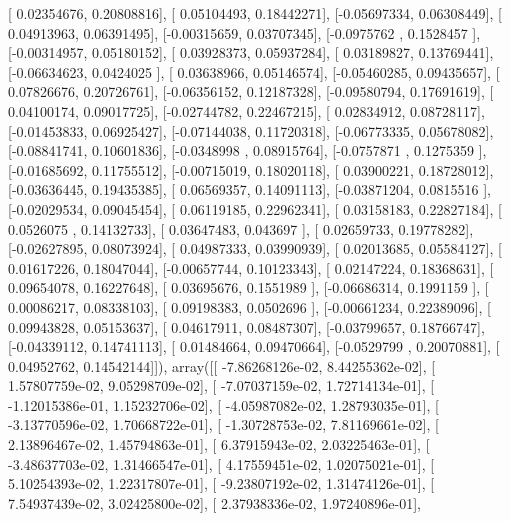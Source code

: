 \documentclass{article}
\begin{document}
       [ 0.02354676,  0.20808816],
       [ 0.05104493,  0.18442271],
       [-0.05697334,  0.06308449],
       [ 0.04913963,  0.06391495],
       [-0.00315659,  0.03707345],
       [-0.0975762 ,  0.1528457 ],
       [-0.00314957,  0.05180152],
       [ 0.03928373,  0.05937284],
       [ 0.03189827,  0.13769441],
       [-0.06634623,  0.0424025 ],
       [ 0.03638966,  0.05146574],
       [-0.05460285,  0.09435657],
       [ 0.07826676,  0.20726761],
       [-0.06356152,  0.12187328],
       [-0.09580794,  0.17691619],
       [ 0.04100174,  0.09017725],
       [-0.02744782,  0.22467215],
       [ 0.02834912,  0.08728117],
       [-0.01453833,  0.06925427],
       [-0.07144038,  0.11720318],
       [-0.06773335,  0.05678082],
       [-0.08841741,  0.10601836],
       [-0.0348998 ,  0.08915764],
       [-0.0757871 ,  0.1275359 ],
       [-0.01685692,  0.11755512],
       [-0.00715019,  0.18020118],
       [ 0.03900221,  0.18728012],
       [-0.03636445,  0.19435385],
       [ 0.06569357,  0.14091113],
       [-0.03871204,  0.0815516 ],
       [-0.02029534,  0.09045454],
       [ 0.06119185,  0.22962341],
       [ 0.03158183,  0.22827184],
       [ 0.0526075 ,  0.14132733],
       [ 0.03647483,  0.043697  ],
       [ 0.02659733,  0.19778282],
       [-0.02627895,  0.08073924],
       [ 0.04987333,  0.03990939],
       [ 0.02013685,  0.05584127],
       [ 0.01617226,  0.18047044],
       [-0.00657744,  0.10123343],
       [ 0.02147224,  0.18368631],
       [ 0.09654078,  0.16227648],
       [ 0.03695676,  0.1551989 ],
       [-0.06686314,  0.1991159 ],
       [ 0.00086217,  0.08338103],
       [ 0.09198383,  0.0502696 ],
       [-0.00661234,  0.22389096],
       [ 0.09943828,  0.05153637],
       [ 0.04617911,  0.08487307],
       [-0.03799657,  0.18766747],
       [-0.04339112,  0.14741113],
       [ 0.01484664,  0.09470664],
       [-0.0529799 ,  0.20070881],
       [ 0.04952762,  0.14542144]]), array([[ -7.86268126e-02,   8.44255362e-02],
       [  1.57807759e-02,   9.05298709e-02],
       [ -7.07037159e-02,   1.72714134e-01],
       [ -1.12015386e-01,   1.15232706e-02],
       [ -4.05987082e-02,   1.28793035e-01],
       [ -3.13770596e-02,   1.70668722e-01],
       [ -1.30728753e-02,   7.81169661e-02],
       [  2.13896467e-02,   1.45794863e-01],
       [  6.37915943e-02,   2.03225463e-01],
       [ -3.48637703e-02,   1.31466547e-01],
       [  4.17559451e-02,   1.02075021e-01],
       [  5.10254393e-02,   1.22317807e-01],
       [ -9.23807192e-02,   1.31474126e-01],
       [  7.54937439e-02,   3.02425800e-02],
       [  2.37938336e-02,   1.97240896e-01],
\end{document}
